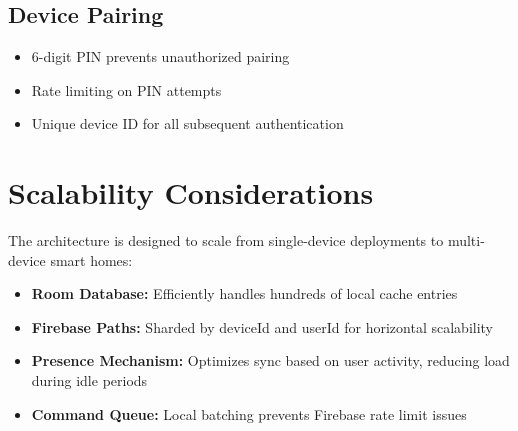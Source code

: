 \subsection{Device Pairing}

\begin{itemize}
    \item 6-digit PIN prevents unauthorized pairing
    \item Rate limiting on PIN attempts
    \item Unique device ID for all subsequent authentication
\end{itemize}

\section{Scalability Considerations}

The architecture is designed to scale from single-device deployments to multi-device smart homes:

\begin{itemize}
    \item \textbf{Room Database:} Efficiently handles hundreds of local cache entries
    \item \textbf{Firebase Paths:} Sharded by deviceId and userId for horizontal scalability
    \item \textbf{Presence Mechanism:} Optimizes sync based on user activity, reducing load during idle periods
    \item \textbf{Command Queue:} Local batching prevents Firebase rate limit issues
\end{itemize}
